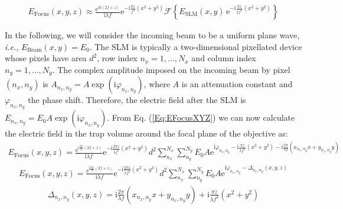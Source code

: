 \documentclass[a4paper,11pt,onecolumn]{scrartcl}
\renewcommand{\i}{\mathrm i}
\newcommand{\e}{\mathrm e}
\begin{document}
\begin{align}
\boxed{
E_\mathrm{Focus}(x,y,z) \approx \frac{\mathrm e^{\i k(2f + z)}}{\i\lambda f}\e^{-\i\frac{kz}{f^2}(x^2+y^2)}\mathcal F\left\{E_\mathrm{SLM}(x, y)\,\e^{-\i\frac{kz}{2f^2}(x^2 + y^2)}\right\}
}
\label{Eq:EFocusXYZ}
\end{align}

In the following, we will consider the incoming beam to be a uniform plane wave, \textit{i.e.}, $E_\mathrm{Beam}(x, y) = E_0$. The SLM is typically a two-dimensional pixellated device whose pixels have area $d^2$, row index $n_x = 1, \dots , N_x$ and column index $n_y = 1, \dots , N_y$. The complex amplitude imposed on the incoming beam by pixel $(n_x , n_y)$ is $A_{n_x, n_y} = A \exp(\i\varphi_{n_x ,n_y})$, where $A$ is an attenuation constant and $\varphi_{n_x ,n_y}$ the phase shift. Therefore, the electric field after the SLM is $E_{n_x, n_y} = E_0 A \exp(\i\varphi_{n_x ,n_y})$. From Eq. (\ref{Eq:EFocusXYZ}) we can now calculate the electric field in the trap volume around the focal plane of the objective as:
\begin{align}
E_\mathrm{Focus}(x,y,z) = \frac{\mathrm e^{\i \frac{2\pi}{\lambda}(2f + z)}}{\i\lambda f}\e^{-\i\frac{2\pi z}{\lambda f^2}(x^2+y^2)}d^2\sum_{n_x}^{N_x}\sum_{n_y}^{N_y} E_0 A\mathrm e^{\mathrm i \varphi_{n_x ,n_y} -\i\frac{\pi z}{\lambda f^2}(x^2 + y^2) -\i\frac{2\pi}{\lambda f}(x_{n_x,n_y} x + y_{n_x,n_y}y)}
\end{align}
\begin{align}
E_\mathrm{Focus}(x,y,z) = \frac{\mathrm e^{\i \frac{2\pi}{\lambda}(2f + z)}}{\i\lambda f}\e^{-\i\frac{2\pi z}{\lambda f^2}(x^2+y^2)}d^2\sum_{n_x}^{N_x}\sum_{n_y}^{N_y} E_0 A\mathrm e^{\mathrm i \varphi_{n_x ,n_y} - \Delta_{n_x ,n_y}(x, y, z)}
\end{align}
\begin{align}
\Delta_{n_x ,n_y}(x, y ,z) = \i\frac{2\pi}{\lambda f}(x_{n_x,n_y} x + y_{n_x,n_y}y) + \i\frac{\pi z}{\lambda f^2}(x^2 + y^2)
\end{align}
\end{document}
